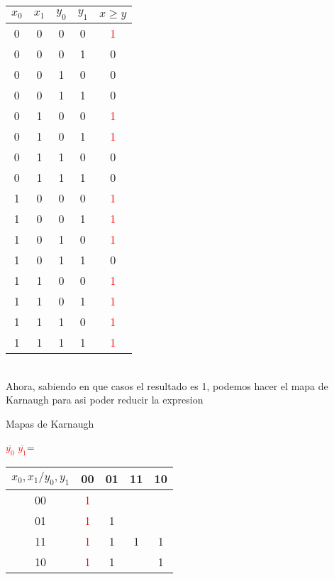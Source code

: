 \documentclass{article}
\begin{document}
    \centering
    \begin{tabular}{|c|c|c|c|c|}
        \hline
        $x_0$ & $x_1$ & $y_0$ & $y_1$ & $x\geq y$ \\
        \hline
        0 & 0 & 0 & 0 & \textcolor{red}{1} \\
        \hline
        0 & 0 & 0 & 1 & 0 \\
        \hline
        0 & 0 & 1 & 0 & 0 \\
        \hline
        0 & 0 & 1 & 1 & 0 \\
        \hline
        0 & 1 & 0 & 0 & \textcolor{red}{1} \\
        \hline
        0 & 1 & 0 & 1 & \textcolor{red}{1} \\
        \hline
        0 & 1 & 1 & 0 & 0 \\
        \hline
        0 & 1 & 1 & 1 & 0 \\
        \hline
        1 & 0 & 0 & 0 & \textcolor{red}{1} \\
        \hline
        1 & 0 & 0 & 1 & \textcolor{red}{1} \\
        \hline
        1 & 0 & 1 & 0 & \textcolor{red}{1} \\
        \hline
        1 & 0 & 1 & 1 & 0 \\
        \hline
        1 & 1 & 0 & 0 & \textcolor{red}{1} \\
        \hline
        1 & 1 & 0 & 1 & \textcolor{red}{1} \\
        \hline
        1 & 1 & 1 & 0 & \textcolor{red}{1}\\
        \hline
        1 & 1 & 1 & 1 & \textcolor{red}{1} \\
        \hline
    \end{tabular}
    \label{tab:mi_tabla}
    \ \\
     Ahora, sabiendo en que casos el resultado es 1, podemos hacer el mapa de Karnaugh para asi poder reducir la expresion

    \centering
    \caption{Mapas de Karnaugh} 
    
    \centering
    \caption{\textcolor{red}{$\overline{y_0}$ $\overline{y_1}$}=} 
    \begin{tabular}{|c|c|c|c|c|}
        \hline
        $x_0,x_1 / y_0,y_1$ & 00 & 01 & 11 & 10 \\
        \hline
        00 & \textcolor{red}{1} &  & &  \\
        \hline
        01 & \textcolor{red}{1} & 1 &  &  \\
        \hline
        11 & \textcolor{red}{1} & 1 & 1 & 1 \\
        \hline
        10 & \textcolor{red}{1} & 1 &  & 1 \\
        \hline
    \end{tabular}
    \ \\
\end{document}
